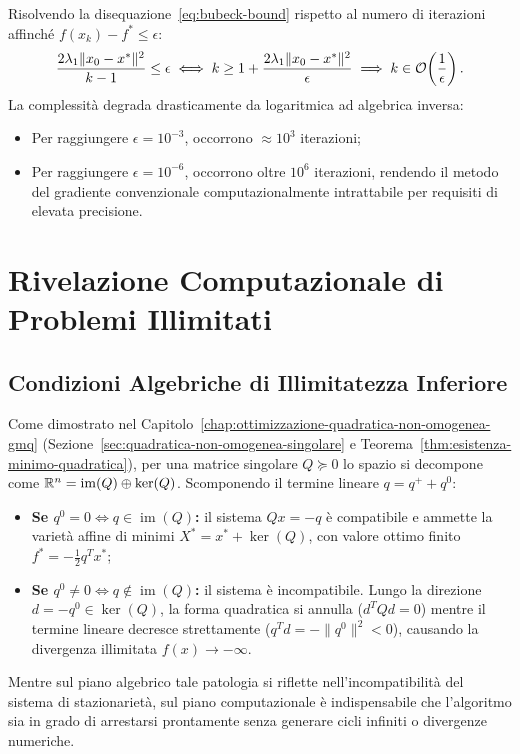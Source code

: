 Risolvendo la disequazione~\eqref{eq:bubeck-bound} rispetto al numero di iterazioni affinch\'e $f(x_k) - f^* \le \epsilon$:
\begin{equation}
    \frac{2 \lambda_1 \|x_0 - x^*\|^2}{k - 1} \le \epsilon \iff k \ge 1 + \frac{2 \lambda_1 \|x_0 - x^*\|^2}{\epsilon} \implies k \in \mathcal{O}\!\left(\frac{1}{\epsilon}\right).
\end{equation}
La complessit\`a degrada drasticamente da logaritmica ad algebrica inversa:
\begin{itemize}
    \item Per raggiungere $\epsilon = 10^{-3}$, occorrono $\approx 10^3$ iterazioni;
    \item Per raggiungere $\epsilon = 10^{-6}$, occorrono oltre $10^6$ iterazioni, rendendo il metodo del gradiente convenzionale computazionalmente intrattabile per requisiti di elevata precisione.
\end{itemize}

\FloatBarrier
\section{Rivelazione Computazionale di Problemi Illimitati}
\label{sec:rivelazione-problemi-illimitati}

\subsection{Condizioni Algebriche di Illimitatezza Inferiore}
Come dimostrato nel Capitolo~\ref{chap:ottimizzazione-quadratica-non-omogenea-gmq} (Sezione~\ref{sec:quadratica-non-omogenea-singolare} e Teorema~\ref{thm:esistenza-minimo-quadratica}), per una matrice singolare $Q \succeq 0$ lo spazio si decompone come $\mathbb{R}^n = \operatorname{im}(Q) \oplus \ker(Q)$. Scomponendo il termine lineare $q = q^+ + q^0$:
\begin{itemize}
    \item \textbf{Se $q^0 = 0 \iff q \in \operatorname{im}(Q)$:} il sistema $Q x = -q$ \`e compatibile e ammette la variet\`a affine di minimi $X^* = x^* + \ker(Q)$, con valore ottimo finito $f^* = -\frac{1}{2} q^T x^*$;
    \item \textbf{Se $q^0 \neq 0 \iff q \notin \operatorname{im}(Q)$:} il sistema \`e incompatibile. Lungo la direzione $d = -q^0 \in \ker(Q)$, la forma quadratica si annulla ($d^T Q d = 0$) mentre il termine lineare decresce strettamente ($q^T d = -\|q^0\|^2 < 0$), causando la divergenza illimitata $f(x) \to -\infty$.
\end{itemize}
Mentre sul piano algebrico tale patologia si riflette nell'incompatibilit\`a del sistema di stazionariet\`a, sul piano computazionale \`e indispensabile che l'algoritmo sia in grado di arrestarsi prontamente senza generare cicli infiniti o divergenze numeriche.

